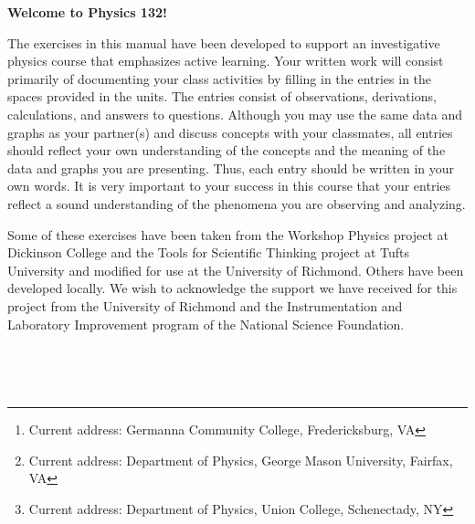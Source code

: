 \author{Matthew G. Belk}
\author{Emory F. Bunn}
\author{Mirela Fetea\footnote{Current address: Germanna Community College, Fredericksburg, VA}}
\author{Gerard P. Gilfoyle}
\author{Henry Nebel}
\author{Philip D. Rubin\footnote{Current address: Department of Physics, George Mason University, Fairfax, VA}}
\author{Jack Singal}
\author{Matthew L. Trawick}
\author{Michael F. Vineyard\footnote{Current address: Department of Physics, Union College, Schenectady, NY}}


\maketitle

\vspace{0.8in}


\begin{center}
\large{\textbf{Welcome to Physics 132!}}
\end{center}

The exercises in this manual have been developed to support an investigative
physics course that emphasizes active learning. 
Your written work will consist primarily of documenting
your class activities by filling in the entries in the spaces provided
in the units. The entries consist of observations, derivations, calculations,
and answers to questions. Although you may use the same data and graphs
as your partner(s) and discuss concepts with your classmates, all
entries should reflect your own understanding of the concepts and
the meaning of the data and graphs you are presenting. Thus, each
entry should be written in your own words. It is very important
to your success in this course that your entries reflect a sound understanding
of the phenomena you are observing and analyzing. 

Some of these exercises
have been taken from the Workshop Physics project at Dickinson College
and the Tools for Scientific Thinking project at Tufts University
and modified for use at the University of Richmond. Others have been
developed locally. 
We wish to acknowledge the support we have received for this project
from the University of Richmond and the Instrumentation and Laboratory
Improvement program of the National Science Foundation. 


\newpage
\
\thispagestyle{plain}

\newpage
\
